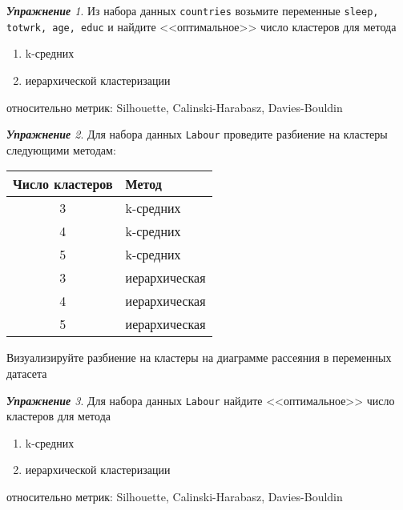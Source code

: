 \documentclass[a4,12pt]{article}
\theoremstyle{remark}
\newtheorem{exercise}{\textbf{Упражнение}}[section]
\begin{document}
\begin{exercise}
Из набора данных \texttt{countries} возьмите переменные 
\texttt{sleep, totwrk, age, educ} и найдите <<оптимальное>> число кластеров
для метода
\begin{enumerate}
	\item k-средних
	\item иерархической кластеризации
\end{enumerate}
относительно метрик: Silhouette, Calinski-Harabasz, Davies-Bouldin
\end{exercise}

\begin{exercise}
Для набора данных \texttt{Labour} проведите разбиение на кластеры следующими
методам:
\begin{center}
	\begin{tabular}{c|l}
		Число кластеров & Метод \\ \hline
		3 & k-средних \\
		4 & k-средних \\
		5 & k-средних \\
		3 & иерархическая \\
		4 & иерархическая \\
		5 & иерархическая \\ \hline
	\end{tabular}
\end{center}
Визуализируйте разбиение на кластеры на диаграмме рассеяния в переменных датасета
\end{exercise}
	
\begin{exercise}
Для набора данных \texttt{Labour} найдите <<оптимальное>> число кластеров
для метода
\begin{enumerate}
	\item k-средних
	\item иерархической кластеризации
\end{enumerate}
относительно метрик: Silhouette, Calinski-Harabasz, Davies-Bouldin
\end{exercise}
\end{document}
